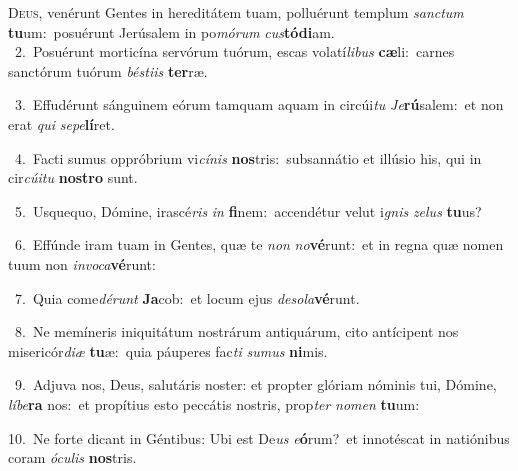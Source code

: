 \lettrine{\initial\textcolor{\initialcolor}{D}}{eus,} venérunt Gentes in hereditátem tuam, polluérunt templum \textit{sanc}\-\textit{tum} \textbf{tu}\-um:~\star posuérunt Jerúsalem in po\-\textit{mó}\-\textit{rum} \textit{cus}\-\textbf{tó}\textbf{di}am.\\
{\numbfont\textcolor{\numbcolor}{~2.}}~Posuérunt morticína servórum tuórum, escas volatí\-\textit{li}\-\textit{bus} \textbf{cæ}\-li:~\star carnes sanctórum tuórum \textit{bés}\-\textit{ti}\textit{is} \textbf{ter}\-ræ.\par
{\numbfont\textcolor{\numbcolor}{~3.}}~Effudérunt sánguinem eórum tamquam aquam in circúi\textit{tu} \textit{Je}\-\textbf{rú}salem:~\star et non erat \textit{qui} \textit{se}\-\textit{pe}\textbf{lí}ret.\par
{\numbfont\textcolor{\numbcolor}{~4.}}~Facti sumus oppróbrium vi\-\textit{cí}\-\textit{nis} \textbf{nos}\-tris:~\star subsannátio et illúsio his, qui in cir\-\textit{cú}\-\textit{i}\textit{tu} \textbf{nos}\-\textbf{tro} sunt.\par
{\numbfont\textcolor{\numbcolor}{~5.}}~Usquequo, Dómine, irascé\textit{ris} \textit{in} \textbf{fi}\-nem:~\star accendétur velut i\textit{gnis} \textit{ze}\-\textit{lus} \textbf{tu}\-us?\par
{\numbfont\textcolor{\numbcolor}{~6.}}~Effúnde iram tuam in Gentes, quæ te \textit{non} \textit{no}\-\textbf{vé}runt:~\star et in regna quæ nomen tuum non \textit{in}\-\textit{vo}\textit{ca}\textbf{vé}runt:\par
{\numbfont\textcolor{\numbcolor}{~7.}}~Quia come\-\textit{dé}\-\textit{runt} \textbf{Ja}\-cob:~\star et locum ejus \textit{de}\-\textit{so}\textit{la}\textbf{vé}runt.\par
{\numbfont\textcolor{\numbcolor}{~8.}}~Ne memíneris iniquitátum nostrárum antiquárum, cito antícipent nos misericór\-\textit{di}\-\textit{æ} \textbf{tu}\-æ:~\star quia páuperes fac\textit{ti} \textit{su}\-\textit{mus} \textbf{ni}\-mis.\par
{\numbfont\textcolor{\numbcolor}{~9.}}~Adjuva nos, Deus, salutáris noster: et propter glóriam nóminis tui, Dómine, \textit{lí}\-\textit{be}\textbf{ra} nos:~\star et propítius esto peccátis nostris, prop\textit{ter} \textit{no}\-\textit{men} \textbf{tu}\-um:\par
{\numbfont\textcolor{\numbcolor}{10.}}~Ne forte dicant in Géntibus: Ubi est De\textit{us} \textit{e}\-\textbf{ó}rum?~\star et innotéscat in natiónibus coram \textit{ó}\-\textit{cu}\textit{lis} \textbf{nos}\-tris.\par
